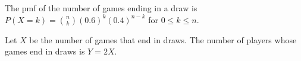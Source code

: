 The pmf of the number of games ending in a draw is $P(X=k) = \binom{n}{k}(0.6)^
{k}(0.4)^{n-k}$ for $0 \leq k \leq n.$

Let $X$ be the number of games that end in draws. The number of
players whose games end in draws is $Y = 2X$.